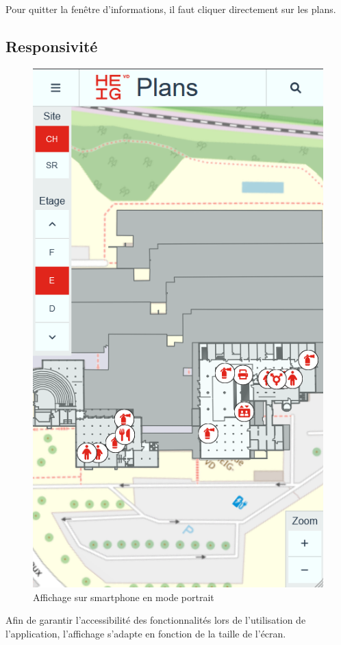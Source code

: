 \documentclass[
    iai, %
    il, %
]{heig-tb}
\begin{document}
Pour quitter la fenêtre d'informations, il faut cliquer directement sur les plans.

\subsection{Responsivité}

\begin{figure}[h]
    \centering
    \includegraphics[scale=0.5]{frontend-responsive-portrait.png}
    \caption{Affichage sur smartphone en mode portrait}
\end{figure}

Afin de garantir l'accessibilité des fonctionnalités lors de l'utilisation de l'application,
l'affichage s'adapte en fonction de la taille de l'écran.
\end{document}
